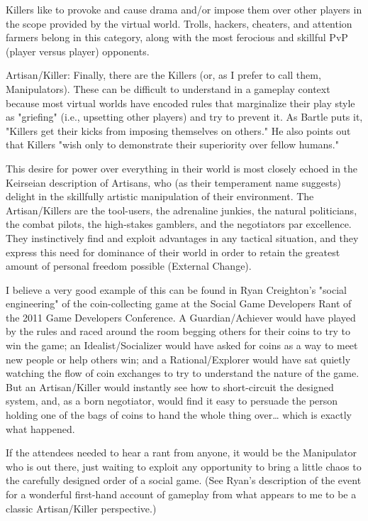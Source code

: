 \documentclass[11pt]{article}
\begin{document}
Killers like to provoke and cause drama and/or impose them over other
players in the scope provided by the virtual world. Trolls, hackers,
cheaters, and attention farmers belong in this category, along with
the most ferocious and skillful PvP (player versus player) opponents.

Artisan/Killer: Finally, there are the Killers (or, as I prefer to
call them, Manipulators). These can be difficult to understand in a
gameplay context because most virtual worlds have encoded rules that
marginalize their play style as "griefing" (i.e., upsetting other
players) and try to prevent it. As Bartle puts it, "Killers get their
kicks from imposing themselves on others." He also points out that
Killers "wish only to demonstrate their superiority over
fellow humans."

This desire for power over everything in their world is most closely
echoed in the Keirseian description of Artisans, who (as their
temperament name suggests) delight in the skillfully artistic
manipulation of their environment. The Artisan/Killers are the
tool-users, the adrenaline junkies, the natural politicians, the
combat pilots, the high-stakes gamblers, and the negotiators
par excellence. They instinctively find and exploit advantages in any
tactical situation, and they express this need for dominance of their
world in order to retain the greatest amount of personal freedom
possible (External Change).

I believe a very good example of this can be found in Ryan
Creighton's "social engineering" of the coin-collecting game at the
Social Game Developers Rant of the 2011 Game Developers Conference. A
Guardian/Achiever would have played by the rules and raced around the
room begging others for their coins to try to win the game; an
Idealist/Socializer would have asked for coins as a way to meet new
people or help others win; and a Rational/Explorer would have sat
quietly watching the flow of coin exchanges to try to understand the
nature of the game. But an Artisan/Killer would instantly see how to
short-circuit the designed system, and, as a born negotiator, would
find it easy to persuade the person holding one of the bags of coins
to hand the whole thing over\ldots{} which is exactly what happened.

If the attendees needed to hear a rant from anyone, it would be the
Manipulator who is out there, just waiting to exploit any opportunity
to bring a little chaos to the carefully designed order of a
social game. (See Ryan's description of the event for a wonderful
first-hand account of gameplay from what appears to me to be a
classic Artisan/Killer perspective.)
\end{document}
